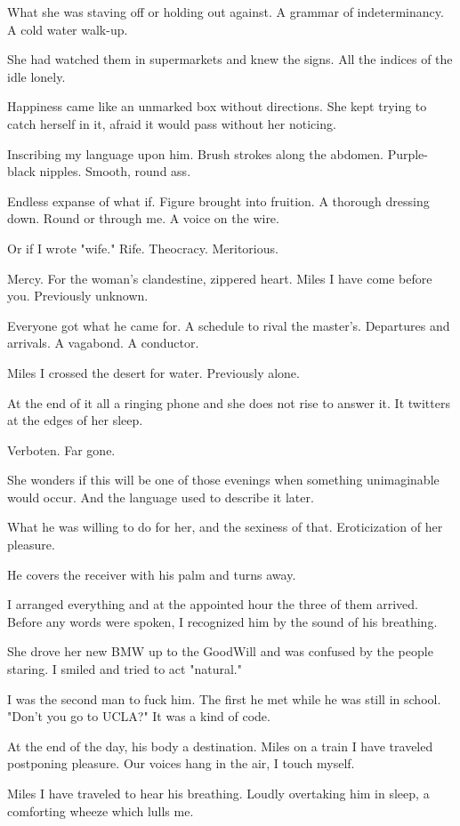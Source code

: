 \documentclass[
]{memoir}
\begin{document}
What she was staving off or holding out against. A grammar of
indeterminancy. A cold water walk-up.

She had watched them in supermarkets and knew the signs. All the indices
of the idle lonely.

Happiness came like an unmarked box without directions. She kept trying
to catch herself in it, afraid it would pass without her noticing.

Inscribing my language upon him. Brush strokes along the abdomen.
Purple-black nipples. Smooth, round ass.

Endless expanse of what if. Figure brought into fruition. A thorough
dressing down. Round or through me. A voice on the wire.

Or if I wrote "wife." Rife. Theocracy. Meritorious.

Mercy. For the woman's clandestine, zippered heart. Miles I have come
before you. Previously unknown.

Everyone got what he came for. A schedule to rival the master's.
Departures and arrivals. A vagabond. A conductor.

Miles I crossed the desert for water. Previously alone.

At the end of it all a ringing phone and she does not rise to answer it.
It twitters at the edges of her sleep.

Verboten. Far gone.

She wonders if this will be one of those evenings when something
unimaginable would occur. And the language used to describe it later.

What he was willing to do for her, and the sexiness of that.
Eroticization of her pleasure.

He covers the receiver with his palm and turns away.

I arranged everything and at the appointed hour the three of them
arrived. Before any words were spoken, I recognized him by the sound of
his breathing.

She drove her new BMW up to the GoodWill and was confused by the people
staring. I smiled and tried to act "natural."

I was the second man to fuck him. The first he met while he was still in
school. "Don't you go to UCLA?" It was a kind of code.

At the end of the day, his body a destination. Miles on a train I have
traveled postponing pleasure. Our voices hang in the air, I touch
myself.

Miles I have traveled to hear his breathing. Loudly overtaking him in
sleep, a comforting wheeze which lulls me.
\end{document}
